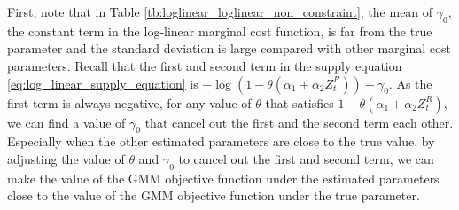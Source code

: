\documentclass[11pt, a4paper]{article}
\begin{document}
First, note that in Table \ref{tb:loglinear_loglinear_non_constraint}, the mean of $\gamma_0$, the constant term in the log-linear marginal cost function, is far from the true parameter and the standard deviation is large compared with other marginal cost parameters. 
Recall that the first and second term in the supply equation \eqref{eq:log_linear_supply_equation} is $-\log(1 - \theta(\alpha_1 + \alpha_2 Z^{R}_{t})) + \gamma_0$.
As the first term is always negative, for any value of $\theta$ that satisfies $1 - \theta(\alpha_1 + \alpha_2 Z^{R}_{t})$, we can find a value of $\gamma_0$ that cancel out the first and the second term each other.
Especially when the other estimated parameters are close to the true value, by adjusting the value of $\theta$ and $\gamma_0$ to cancel out the first and second term, we can make the value of the GMM objective function under the estimated parameters close to the value of the GMM objective function under the true parameter.
\end{document}
